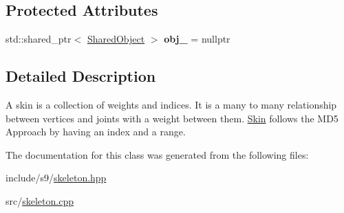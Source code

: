 \subsection*{Protected Attributes}
\begin{DoxyCompactItemize}
\item 
\hypertarget{classs9_1_1Skin_a18777933793b0ab5563a38880ac9f955}{std\-::shared\-\_\-ptr$<$ \hyperlink{structs9_1_1Skin_1_1SharedObject}{Shared\-Object} $>$ {\bfseries obj\-\_\-} = nullptr}\label{classs9_1_1Skin_a18777933793b0ab5563a38880ac9f955}

\end{DoxyCompactItemize}


\subsection{Detailed Description}
A skin is a collection of weights and indices. It is a many to many relationship between vertices and joints with a weight between them. \hyperlink{classs9_1_1Skin}{Skin} follows the M\-D5 Approach by having an index and a range. 

The documentation for this class was generated from the following files\-:\begin{DoxyCompactItemize}
\item 
include/s9/\hyperlink{skeleton_8hpp}{skeleton.\-hpp}\item 
src/\hyperlink{skeleton_8cpp}{skeleton.\-cpp}\end{DoxyCompactItemize}

